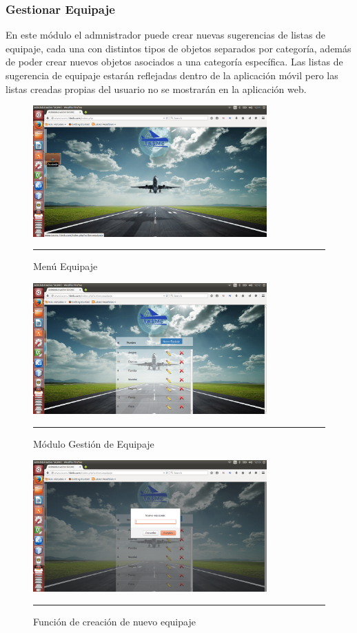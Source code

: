 \subsubsection{Gestionar Equipaje}
En este módulo el admnistrador puede crear nuevas sugerencias de listas de equipaje, cada una con distintos tipos de objetos separados 
por categoría, además de poder crear nuevos objetos asociados a una categoría específica. Las listas de sugerencia de equipaje estarán 
reflejadas dentro de la aplicación móvil pero las listas creadas propias del usuario no se mostrarán en la aplicación web.
\begin{figure}[h!]
	\centering
		\includegraphics[width=0.8\textwidth]{Figuras/indexEquipaje.png}
		\rule{35em}{0.5pt}
	\caption[Menú Equipaje]{Menú Equipaje}
	\label{fig:menuEquipaje}
\end{figure}
\begin{figure}[h!]
	\centering
		\includegraphics[width=0.8\textwidth]{Figuras/equipajes.png}
		\rule{35em}{0.5pt}
	\caption[Módulo Gestión de Equipaje]{Módulo Gestión de Equipaje}
	\label{fig:moduloEquipaje}
\end{figure}

\begin{figure}[h!]
	\centering
		\includegraphics[width=0.8\textwidth]{Figuras/nuevoequipajewb.png}
		\rule{35em}{0.5pt}
	\caption[Función de creación de nuevo equipaje]{Función de creación de nuevo equipaje}
	\label{fig:funcionNuevoEquipaje}
\end{figure}

